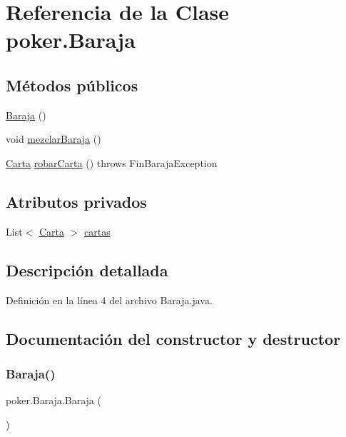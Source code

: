 \hypertarget{classpoker_1_1Baraja}{}\section{Referencia de la Clase poker.\+Baraja}
\label{classpoker_1_1Baraja}
\subsection*{Métodos públicos}
\begin{DoxyCompactItemize}
\item 
\mbox{\hyperlink{classpoker_1_1Baraja_aa3003f220dd7f18565095c2f34bc4ff7}{Baraja}} ()
\item 
void \mbox{\hyperlink{classpoker_1_1Baraja_a83f7910d78df1da64aefdf640a9fefe7}{mezclar\+Baraja}} ()
\item 
\mbox{\hyperlink{classpoker_1_1Carta}{Carta}} \mbox{\hyperlink{classpoker_1_1Baraja_a2eaf33a7d657fb1f5181d0c5307c300b}{robar\+Carta}} ()  throws Fin\+Baraja\+Exception
\end{DoxyCompactItemize}
\subsection*{Atributos privados}
\begin{DoxyCompactItemize}
\item 
List$<$ \mbox{\hyperlink{classpoker_1_1Carta}{Carta}} $>$ \mbox{\hyperlink{classpoker_1_1Baraja_a267e10bf1a0fadd4b1bfa3f243fdfcf6}{cartas}}
\end{DoxyCompactItemize}


\subsection{Descripción detallada}


Definición en la línea 4 del archivo Baraja.\+java.



\subsection{Documentación del constructor y destructor}
\mbox{\label{classpoker_1_1Baraja_aa3003f220dd7f18565095c2f34bc4ff7}} 
\subsubsection{\texorpdfstring{Baraja()}{Baraja()}}
{\footnotesize\ttfamily poker.\+Baraja.\+Baraja (\begin{DoxyParamCaption}{ }\end{DoxyParamCaption})}



